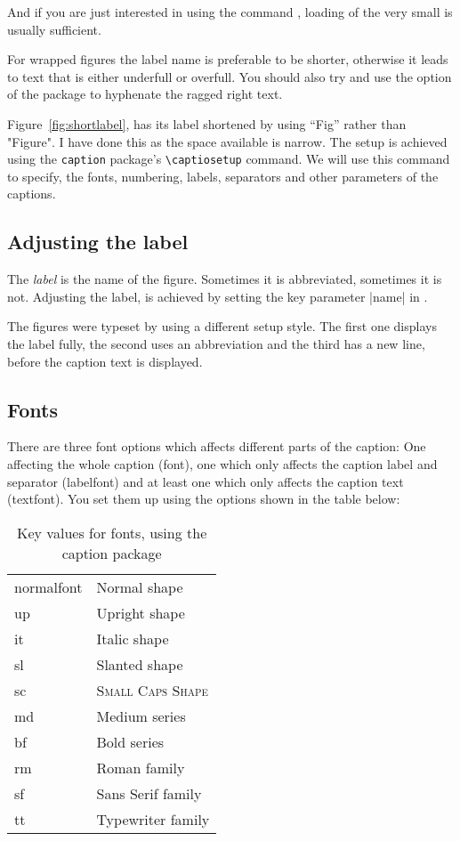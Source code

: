 And if you are just interested in using the
command \cmd{\captionof}, loading of the very small  is usually sufficient.

For wrapped figures the label name is preferable to be shorter, otherwise it leads to text that is either underfull or overfull. You should also try and use the \cmd{\RaggedRight} option of the  package to hyphenate the ragged right text.

Figure~\ref{fig:shortlabel}, has its label shortened by using ``Fig'' rather than "Figure". I have done this as the space available is narrow. The setup is achieved using the \texttt{caption} package's \verb+\captiosetup+ command. We will use this command to specify, the fonts, numbering, labels, separators and other parameters of the captions.

\subsection{Adjusting the label\hfill\hfill}%

The \emph{label} is the name of the figure. Sometimes it is abbreviated, sometimes it is not. Adjusting the label, is achieved by setting the key parameter |name| in \cmd{\captionsetup}. 

\begin{commands}[]{}
\cmd{\captionsetup}
\end{commands}



The figures were typeset by using a different setup style. The first one displays the  label fully, the second uses an abbreviation and the third has a new line, before the caption text is displayed.

\subsection{Fonts}

There are three font options which affects different parts of the caption: One affecting the
whole caption (font), one which only affects the caption label and separator (labelfont) and at least one which only affects the caption text (textfont). You set them up using the options shown in the table below:

\begin{table}[htp]
\centering
\smaller
\caption{Key values for fonts, using the caption package}
\begin{tabular}{ll}
\toprule
normalfont &Normal shape\\
up &Upright shape\\
it &Italic shape \\
sl &Slanted shape\\
sc & \textsc{Small Caps Shape}\\
md &Medium series\\
bf &Bold series\\
rm &Roman family\\
sf &Sans Serif family\\
tt &Typewriter family\\
\bottomrule
\end{tabular}
\end{table}

